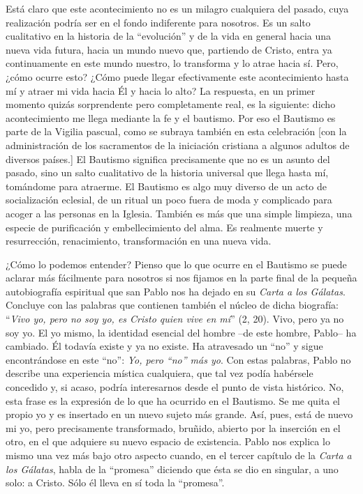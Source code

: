 			\begin{body}Está claro que este acontecimiento no es un milagro cualquiera del pasado, cuya realización podría ser en el fondo indiferente para nosotros. Es un salto cualitativo en la historia de la “evolución” y de la vida en general hacia una nueva vida futura, hacia un mundo nuevo que, partiendo de Cristo, entra ya continuamente en este mundo nuestro, lo transforma y lo atrae hacia sí. Pero, ¿cómo ocurre esto? ¿Cómo puede llegar efectivamente este acontecimiento hasta mí y atraer mi vida hacia Él y hacia lo alto? La respuesta, en un primer momento quizás sorprendente pero completamente real, es la siguiente: dicho acontecimiento me llega mediante la fe y el bautismo. Por eso el Bautismo es parte de la Vigilia pascual, como se subraya también en esta celebración [con la administración de los sacramentos de la iniciación cristiana a algunos adultos de diversos países.] El Bautismo significa precisamente que no es un asunto del pasado, sino un salto cualitativo de la historia universal que llega hasta mí, tomándome para atraerme. El Bautismo es algo muy diverso de un acto de socialización eclesial, de un ritual un poco fuera de moda y complicado para acoger a las personas en la Iglesia. También es más que una simple limpieza, una especie de purificación y embellecimiento del alma. Es realmente muerte y resurrección, renacimiento, transformación en una nueva vida.\end{body}
			
			\begin{body}¿Cómo lo podemos entender? Pienso que lo que ocurre en el Bautismo se puede aclarar más fácilmente para nosotros si nos fijamos en la parte final de la pequeña autobiografía espiritual que san Pablo nos ha dejado en su \textit{Carta a los Gálatas}. Concluye con las palabras que contienen también el núcleo de dicha biografía: “\textit{Vivo yo, pero no soy yo, es Cristo quien vive en mí}” (2, 20). Vivo, pero ya no soy yo. El yo mismo, la identidad esencial del hombre –de este hombre, Pablo– ha cambiado. Él todavía existe y ya no existe. Ha atravesado un “no” y sigue encontrándose en este “no”: \textit{Yo, pero “no” más yo}. Con estas palabras, Pablo no describe una experiencia mística cualquiera, que tal vez podía habérsele concedido y, si acaso, podría interesarnos desde el punto de vista histórico. No, esta frase es la expresión de lo que ha ocurrido en el Bautismo. Se me quita el propio yo y es insertado en un nuevo sujeto más grande. Así, pues, está de nuevo mi yo, pero precisamente transformado, bruñido, abierto por la inserción en el otro, en el que adquiere su nuevo espacio de existencia. Pablo nos explica lo mismo una vez más bajo otro aspecto cuando, en el tercer capítulo de la \textit{Carta a los Gálatas}, habla de la “promesa” diciendo que ésta se dio en singular, a uno solo: a Cristo. Sólo él lleva en sí toda la “promesa”.\end{body}
			
